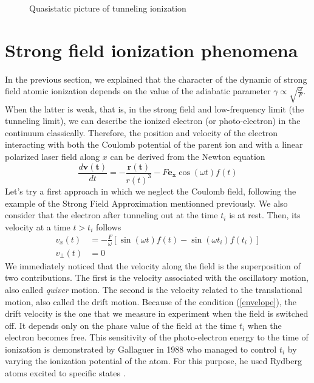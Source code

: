 \documentclass[a4paper]{article}
\begin{document}
\begin{figure}[h] 
\centering
 
 \caption{Quasistatic picture of tunneling ionization}
 \label{tunneling_ionization} 
\end{figure}

\section{Strong field ionization phenomena}

In the previous section, we explained that the character of the dynamic of strong field atomic ionization depends on the value of the adiabatic parameter $\gamma \propto \sqrt{\frac{\omega}{F}}$. When the latter is weak, that is, in the strong field and low-frequency limit (the tunneling limit), we can describe the ionized electron (or photo-electron) in the continuum classically. Therefore, the position and velocity of the electron interacting with both the Coulomb potential of the parent ion and with a linear polarized laser field along $x$ can be derived from the Newton equation
\begin{equation}
\frac{d \mathbf{v(t)}}{dt}=-\frac{\mathbf{r(t)}}{r(t)^{3}}-F\mathbf{e_{x}}\cos(\omega t) f(t) 
\end{equation}
Let's try a first approach in which we neglect the Coulomb field, following the example of the Strong Field Approximation mentionned previously. We also consider that the electron after tunneling out at the time $t_{i}$ is at rest. Then, its velocity at a time $t>t_{i}$ follows
\begin{align}
\label{velocity_free_motion}
v_{x}(t)&=-\frac{F}{\omega}\left[\sin(\omega t) f(t)-\sin(\omega t_{i}) f(t_{i})\right] \\
v_{\perp}(t)&=0
\end{align}
We immediately noticed that the velocity along the field is the superposition of two contributions. The first is the velocity associated with the oscillatory motion, also called \textit{quiver} motion. The second is the velocity related to the translational motion, also called the drift motion. Because of the condition (\ref{envelope}), the drift velocity is the one that we measure in experiment when the field is switched off. It depends only on the phase value of the field at the time $t_{i}$ when the electron becomes free. This sensitivity of the photo-electron energy to the time of ionization is demonstrated by Gallaguer in 1988 who managed to control $t_{i}$ by varying the ionization potential of the atom. For this purpose, he used Rydberg atoms excited to specific states \cite{Gallagher_1988}.
\end{document}
